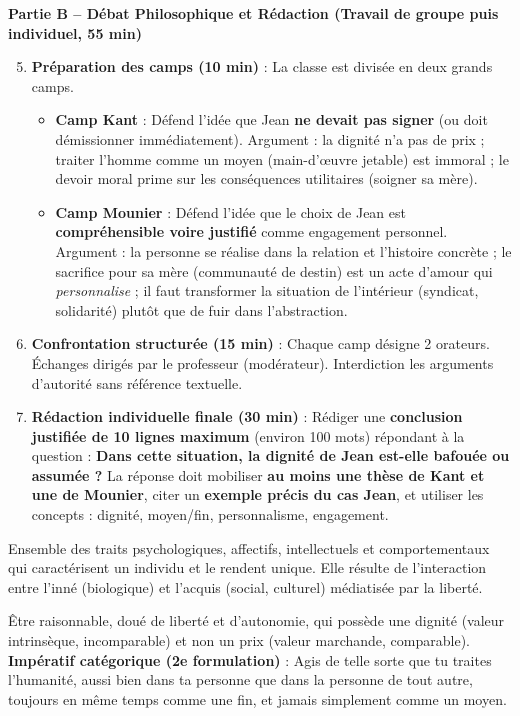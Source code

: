 \documentclass[11pt]{article}
\newcommand{\cle}[1]{{\popxbold\color{popdark}#1}}
\newcounter{popsec}
\newcounter{popsub}
\newcommand{\courssub}[1]{%
  \stepcounter{popsub}%
  \par\vspace{9pt}\noindent{\popxbold\fontsize{11.5}{13}\selectfont\color{popink}{\color{poporange}\thepopsec.\thepopsub}\hspace{6pt}#1}\par\nopagebreak\vspace{4pt}
}
\begin{document}
\textbf{Partie B -- Débat Philosophique et Rédaction (Travail de groupe puis individuel, 55 min)}
\begin{enumerate}
    \setcounter{enumi}{4}
    \item \textbf{Préparation des camps (10 min)} : La classe est divisée en deux grands camps.
        \begin{itemize}
            \item \textbf{Camp Kant} : Défend l'idée que Jean \textbf{ne devait pas signer} (ou doit démissionner immédiatement). Argument : la dignité n'a pas de prix ; traiter l'homme comme un moyen (main-d'œuvre jetable) est immoral ; le devoir moral prime sur les conséquences utilitaires (soigner sa mère).
            \item \textbf{Camp Mounier} : Défend l'idée que le choix de Jean est \textbf{compréhensible voire justifié} comme engagement personnel. Argument : la personne se réalise dans la relation et l'histoire concrète ; le sacrifice pour sa mère (communauté de destin) est un acte d'amour qui \textit{personnalise} ; il faut transformer la situation de l'intérieur (syndicat, solidarité) plutôt que de fuir dans l'abstraction.
        \end{itemize}
    \item \textbf{Confrontation structurée (15 min)} : Chaque camp désigne 2 orateurs. Échanges dirigés par le professeur (modérateur). Interdiction les arguments d'autorité sans référence textuelle.
    \item \textbf{Rédaction individuelle finale (30 min)} : Rédiger une \textbf{conclusion justifiée de 10 lignes maximum} (environ 100 mots) répondant à la question : \og{} \textbf{Dans cette situation, la dignité de Jean est-elle bafouée ou assumée ?} \fg{} La réponse doit mobiliser \textbf{au moins une thèse de Kant et une de Mounier}, citer un \textbf{exemple précis du cas Jean}, et utiliser les concepts : \cle{dignité}, \cle{moyen/fin}, \cle{personnalisme}, \cle{engagement}.
\end{enumerate}

\courssub{Ressources à mobiliser}
\begin{definition}[Personnalité]
Ensemble des traits psychologiques, affectifs, intellectuels et comportementaux qui caractérisent un individu et le rendent unique. Elle résulte de l'interaction entre l'inné (biologique) et l'acquis (social, culturel) médiatisée par la liberté.
\end{definition}

\begin{definition}
Être raisonnable, doué de liberté et d'autonomie, qui possède une \cle{dignité} (valeur intrinsèque, incomparable) et non un \cle{prix} (valeur marchande, comparable). \textbf{Impératif catégorique (2e formulation)} : \og{} Agis de telle sorte que tu traites l'humanité, aussi bien dans ta personne que dans la personne de tout autre, toujours en même temps comme une fin, et jamais simplement comme un moyen. \fg{}
\end{definition}
\end{document}
